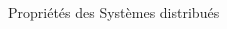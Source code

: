 \documentclass[presentation]{beamer}
\begin{document}
\begin{frame}[label={sec:org969e7f9}]{Propriétés des Systèmes distribués}
\begin{columns}
\begin{column}{0.46\columnwidth}
\begin{block}
\end{block}
\end{column}
\end{columns}
\end{frame}
\end{document}
